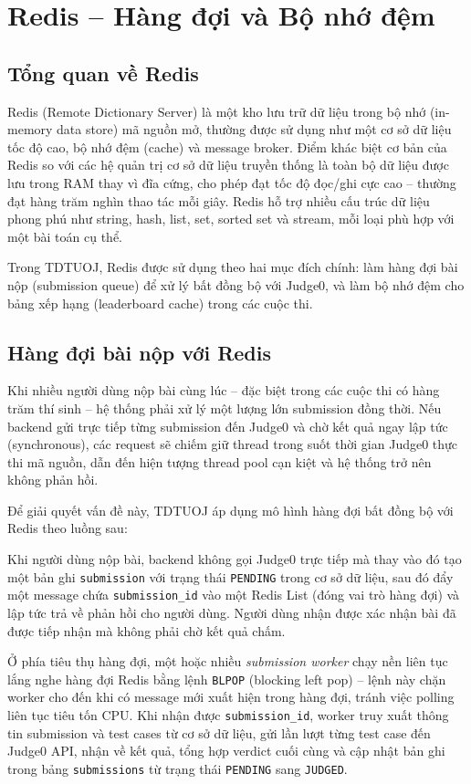 \documentclass[12pt, a4paper]{report}
\begin{document}
\section{Redis -- Hàng đợi và Bộ nhớ đệm}

\subsection{Tổng quan về Redis}

Redis (Remote Dictionary Server) là một kho lưu trữ dữ liệu trong bộ nhớ (in-memory data store) mã nguồn mở, thường được sử dụng như một cơ sở dữ liệu tốc độ cao, bộ nhớ đệm (cache) và message broker. Điểm khác biệt cơ bản của Redis so với các hệ quản trị cơ sở dữ liệu truyền thống là toàn bộ dữ liệu được lưu trong RAM thay vì đĩa cứng, cho phép đạt tốc độ đọc/ghi cực cao -- thường đạt hàng trăm nghìn thao tác mỗi giây. Redis hỗ trợ nhiều cấu trúc dữ liệu phong phú như string, hash, list, set, sorted set và stream, mỗi loại phù hợp với một bài toán cụ thể.

Trong TDTUOJ, Redis được sử dụng theo hai mục đích chính: làm hàng đợi bài nộp (submission queue) để xử lý bất đồng bộ với Judge0, và làm bộ nhớ đệm cho bảng xếp hạng (leaderboard cache) trong các cuộc thi.

\subsection{Hàng đợi bài nộp với Redis}

Khi nhiều người dùng nộp bài cùng lúc -- đặc biệt trong các cuộc thi có hàng trăm thí sinh -- hệ thống phải xử lý một lượng lớn submission đồng thời. Nếu backend gửi trực tiếp từng submission đến Judge0 và chờ kết quả ngay lập tức (synchronous), các request sẽ chiếm giữ thread trong suốt thời gian Judge0 thực thi mã nguồn, dẫn đến hiện tượng thread pool cạn kiệt và hệ thống trở nên không phản hồi.

Để giải quyết vấn đề này, TDTUOJ áp dụng mô hình hàng đợi bất đồng bộ với Redis theo luồng sau:

Khi người dùng nộp bài, backend không gọi Judge0 trực tiếp mà thay vào đó tạo một bản ghi \texttt{submission} với trạng thái \texttt{PENDING} trong cơ sở dữ liệu, sau đó đẩy một message chứa \texttt{submission\_id} vào một Redis List (đóng vai trò hàng đợi) và lập tức trả về phản hồi cho người dùng. Người dùng nhận được xác nhận bài đã được tiếp nhận mà không phải chờ kết quả chấm.

Ở phía tiêu thụ hàng đợi, một hoặc nhiều \textit{submission worker} chạy nền liên tục lắng nghe hàng đợi Redis bằng lệnh \texttt{BLPOP} (blocking left pop) -- lệnh này chặn worker cho đến khi có message mới xuất hiện trong hàng đợi, tránh việc polling liên tục tiêu tốn CPU. Khi nhận được \texttt{submission\_id}, worker truy xuất thông tin submission và test cases từ cơ sở dữ liệu, gửi lần lượt từng test case đến Judge0 \ac{API}, nhận về kết quả, tổng hợp verdict cuối cùng và cập nhật bản ghi trong bảng \texttt{submissions} từ trạng thái \texttt{PENDING} sang \texttt{JUDGED}.
\end{document}
